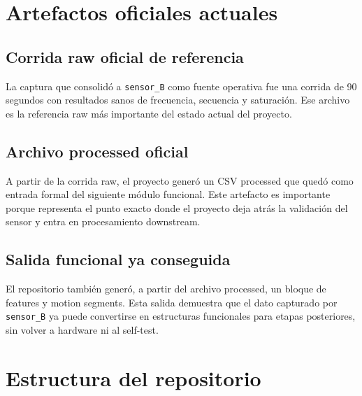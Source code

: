 \documentclass[11pt,a4paper]{article}
\begin{document}
\section{Artefactos oficiales actuales}

\subsection{Corrida raw oficial de referencia}

La captura que consolidó a \texttt{sensor\_B} como fuente operativa fue una corrida de 90 segundos con resultados sanos de frecuencia, secuencia y saturación. Ese archivo es la referencia raw más importante del estado actual del proyecto.

\subsection{Archivo processed oficial}

A partir de la corrida raw, el proyecto generó un CSV processed que quedó como entrada formal del siguiente módulo funcional. Este artefacto es importante porque representa el punto exacto donde el proyecto deja atrás la validación del sensor y entra en procesamiento downstream.

\subsection{Salida funcional ya conseguida}

El repositorio también generó, a partir del archivo processed, un bloque de features y motion segments. Esta salida demuestra que el dato capturado por \texttt{sensor\_B} ya puede convertirse en estructuras funcionales para etapas posteriores, sin volver a hardware ni al self-test.

\section{Estructura del repositorio}
\end{document}
